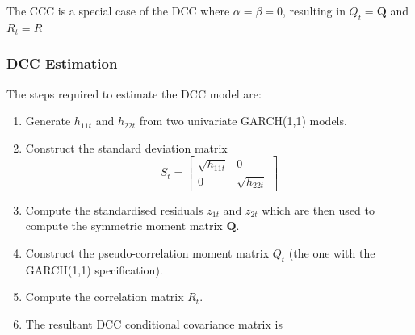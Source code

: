\documentclass[11pt]{article}
\begin{document}
The CCC is a special case of the DCC where $\alpha=\beta=0$, resulting in $Q_t = \boldsymbol{Q}$ and $R_t = R$

\subsubsection{DCC Estimation}

\begin{procedure}
    The steps required to estimate the DCC model are:
    \begin{enumerate}
        \item Generate $h_{11t}$ and $h_{22t}$ from two univariate GARCH(1,1) models.
        \item Construct the standard deviation matrix
        \begin{equation}
            S_t=\left[\begin{array}{cc}
            \sqrt{h_{11 t}} & 0 \\
            0 & \sqrt{h_{22 t}}
        \end{array}\right]
        \end{equation}
        \item Compute the standardised residuals $z_{1t}$ and $z_{2t}$ which are then used to compute the symmetric moment matrix $\boldsymbol{Q}$.
        \item  Construct the pseudo-correlation moment matrix $Q_t$ (the one with the GARCH(1,1) specification).
        \item Compute the correlation matrix $R_t$.
        \item The resultant DCC conditional covariance matrix is


\end{enumerate}
\end{procedure}
\end{document}
